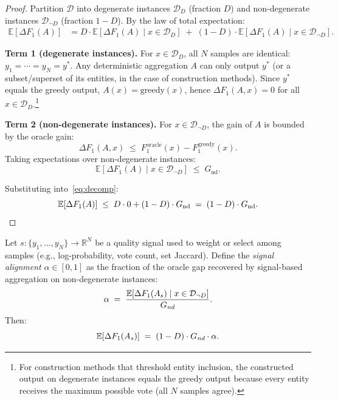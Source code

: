 \begin{proof}
Partition $\mathcal{D}$ into degenerate instances $\mathcal{D}_D$ (fraction $D$) and non-degenerate instances $\mathcal{D}_{\neg D}$ (fraction $1-D$). By the law of total expectation:
\begin{align}
\mathbb{E}[\Delta F_1(A)]
&= D \cdot \mathbb{E}[\Delta F_1(A) \mid x \in \mathcal{D}_D] \;+\; (1-D) \cdot \mathbb{E}[\Delta F_1(A) \mid x \in \mathcal{D}_{\neg D}]. \label{eq:decomp}
\end{align}

\textbf{Term 1 (degenerate instances).}
For $x \in \mathcal{D}_D$, all $N$ samples are identical: $y_1 = \cdots = y_N = y^*$. Any deterministic aggregation $A$ can only output $y^*$ (or a subset/superset of its entities, in the case of construction methods). Since $y^*$ equals the greedy output, $A(x) = \text{greedy}(x)$, hence $\Delta F_1(A, x) = 0$ for all $x \in \mathcal{D}_D$.\footnote{For construction methods that threshold entity inclusion, the constructed output on degenerate instances equals the greedy output because every entity receives the maximum possible vote (all $N$ samples agree).}

\textbf{Term 2 (non-degenerate instances).}
For $x \in \mathcal{D}_{\neg D}$, the gain of $A$ is bounded by the oracle gain:
\[
\Delta F_1(A, x) \;\leq\; F_1^{\text{oracle}}(x) - F_1^{\text{greedy}}(x).
\]
Taking expectations over non-degenerate instances:
\[
\mathbb{E}[\Delta F_1(A) \mid x \in \mathcal{D}_{\neg D}] \;\leq\; G_{\text{nd}}.
\]

Substituting into~\eqref{eq:decomp}:
\[
\mathbb{E}[\Delta F_1(A)] \;\leq\; D \cdot 0 + (1-D) \cdot G_{\text{nd}} \;=\; (1-D) \cdot G_{\text{nd}}. \qedhere
\]
\end{proof}

\begin{theorem}
\label{thm:signal-bound}
Let $s: \{y_1, \ldots, y_N\} \to \mathbb{R}^N$ be a quality signal used to weight or select among samples (e.g., log-probability, vote count, set Jaccard). Define the \emph{signal alignment} $\alpha \in [0, 1]$ as the fraction of the oracle gap recovered by signal-based aggregation on non-degenerate instances:
\[
\alpha \;=\; \frac{\mathbb{E}[\Delta F_1(A_s) \mid x \in \mathcal{D}_{\neg D}]}{G_{\emph{nd}}}.
\]
Then:
\begin{equation}
\label{eq:signal-bound}
\mathbb{E}[\Delta F_1(A_s)] \;=\; (1-D) \cdot G_{\emph{nd}} \cdot \alpha.
\end{equation}
\end{theorem}

